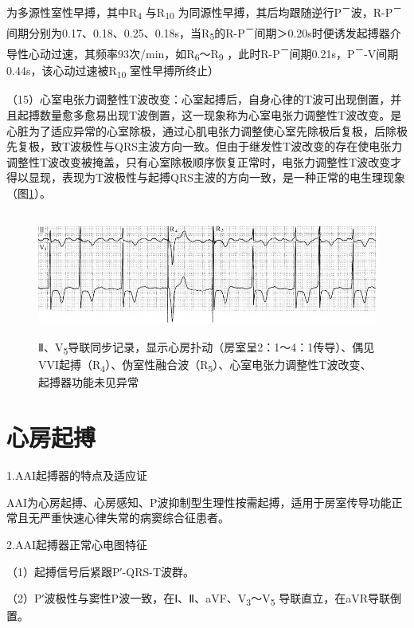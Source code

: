 为多源性室性早搏，其中R\textsubscript{4} 与R\textsubscript{10}
为同源性早搏，其后均跟随逆行P\textsuperscript{－}波，R-P\textsuperscript{－}间期分别为0.17、0.18、0.25、0.18s，当R\textsubscript{5}的R-P\textsuperscript{－}间期＞0.20s时便诱发起搏器介导性心动过速，其频率93次/min，如R\textsubscript{6}～R\textsubscript{9} ，此时R-P\textsuperscript{－}间期0.21s，P\textsuperscript{－}-V间期0.44s，该心动过速被R\textsubscript{10} 室性早搏所终止）

（15）心室电张力调整性T波改变：心室起搏后，自身心律的T波可出现倒置，并且起搏数量愈多愈易出现T波倒置，这一现象称为心室电张力调整性T波改变。是心脏为了适应异常的心室除极，通过心肌电张力调整使心室先除极后复极，后除极先复极，致T波极性与QRS主波方向一致。但由于继发性T波改变的存在使电张力调整性T波改变被掩盖，只有心室除极顺序恢复正常时，电张力调整性T波改变才得以显现，表现为T波极性与起搏QRS主波的方向一致，是一种正常的电生理现象（图\ref{fig38-13}）。

\begin{figure}[!htbp]
 \centering
 \includegraphics[width=5.58333in,height=1.61458in]{./images/Image00616.jpg}
 \captionsetup{justification=centering}
 \caption{Ⅱ、V\textsubscript{5}导联同步记录，显示心房扑动（房室呈2：1～4：1传导）、偶见VVI起搏（R\textsubscript{4}）、伪室性融合波（R\textsubscript{5}）、心室电张力调整性T波改变、起搏器功能未见异常}
 \label{fig38-13}
  \end{figure} 


\protect\hypertarget{text00045.htmlux5cux23subid491}{}{}

\section{心房起搏}

1.AAI起搏器的特点及适应证

AAI为心房起搏、心房感知、P波抑制型生理性按需起搏，适用于房室传导功能正常且无严重快速心律失常的病窦综合征患者。

2.AAI起搏器正常心电图特征

（1）起搏信号后紧跟P′-QRS-T波群。

（2）P′波极性与窦性P波一致，在Ⅰ、Ⅱ、aVF、V\textsubscript{3}～V\textsubscript{5} 导联直立，在aVR导联倒置。

